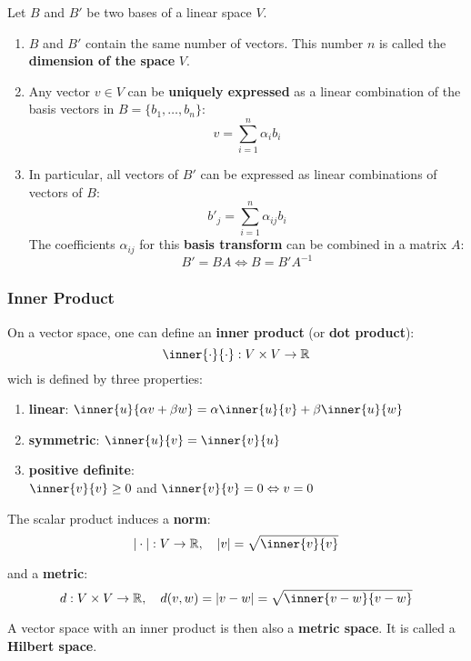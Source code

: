 Let $B$ and $B'$ be two bases of a linear space $V$.

\begin{enumerate}
	\item $B$ and $B'$ contain the same number of vectors.
	This number $n$ is called the \textbf{dimension of the space} $V$.

\item Any vector $v \in V$ can be \textbf{uniquely expressed}
	as a linear combination of the basis vectors in
	$B = \{b_1, \hdots, b_n\}$:
	\[
		v = \sum_{i=1}^n \alpha_i b_i
	\]
	\item In particular, all vectors of $B'$ can be expressed as
	linear combinations of vectors of $B$:
	\[
		b'_j = \sum_{i=1}^n \alpha_{ij} b_i
	\]
	The coefficients $\alpha_{ij}$ for this \textbf{basis transform}
	can be combined in a matrix $A$:
	\[
		B' = BA \Leftrightarrow B = B'A^{-1}
	\]
\end{enumerate}


\subsubsection{Inner Product}
\label{ssub:inner_product}

On a vector space, one can define an \textbf{inner product}
(or \textbf{dot product}):
\[\inner{\cdot}{\cdot} : V \times V \rightarrow \R\]
wich is defined by three properties:
\begin{enumerate}
	\item \textbf{linear}:
		$\inner{u}{\alpha v + \beta w} = \alpha \inner{u}{v} + \beta \inner{u}{w}$

	\item \textbf{symmetric}:
		$\inner{u}{v} = \inner{v}{u}$

	\item \textbf{positive definite}:\\
		$\inner{v}{v} \geq 0$ and $\inner{v}{v} = 0 \Leftrightarrow v = 0$
	
\end{enumerate}

\noindent
The scalar product induces a \textbf{norm}:
\[|\cdot| : V \rightarrow \R, \quad |v| = \sqrt{\inner{v}{v}}\]

\noindent
and a \textbf{metric}:
\[d : V \times V \rightarrow \R, \quad d(v,w) = |v - w| = \sqrt{\inner{v-w}{v-w}}\]

\noindent
A vector space with an inner product is then also
a \textbf{metric space}. It is called a \textbf{Hilbert space}.


